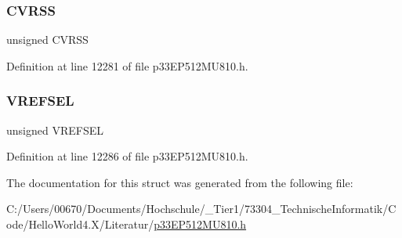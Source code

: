 \subsubsection{\texorpdfstring{C\+V\+R\+SS}{CVRSS}}
{\footnotesize\ttfamily unsigned C\+V\+R\+SS}



Definition at line 12281 of file p33\+E\+P512\+M\+U810.\+h.

\mbox{\label{structtag_c_v_r_c_o_n_b_i_t_s_ad9b87d5337ead209785f97dc1716298c}} 
\subsubsection{\texorpdfstring{V\+R\+E\+F\+S\+EL}{VREFSEL}}
{\footnotesize\ttfamily unsigned V\+R\+E\+F\+S\+EL}



Definition at line 12286 of file p33\+E\+P512\+M\+U810.\+h.



The documentation for this struct was generated from the following file\+:\begin{DoxyCompactItemize}
\item 
C\+:/\+Users/00670/\+Documents/\+Hochschule/\+\_\+\+Tier1/73304\+\_\+\+Technische\+Informatik/\+Code/\+Hello\+World4.\+X/\+Literatur/\hyperlink{p33_e_p512_m_u810_8h}{p33\+E\+P512\+M\+U810.\+h}\end{DoxyCompactItemize}
